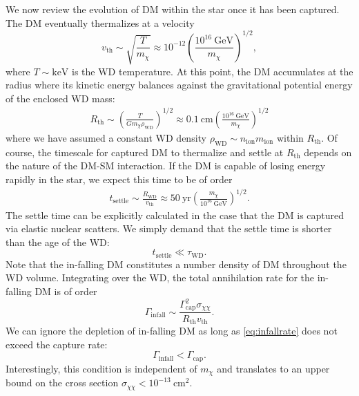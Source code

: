 \documentclass[preprintnumbers,amsmath,amssymb,prd,superscriptaddress]{revtex4}
\newcommand{\GeV}{\text{GeV}}
\newcommand{\keV}{\text{keV}}
\newcommand{\cm}{\text{cm}}
\def\r{\right)}
\def\l{\left(}
\begin{document}
We now review the evolution of DM within the star once it has been captured. 
The DM eventually thermalizes at a velocity
\begin{equation}
v_\text{th} \sim \sqrt{\frac{T}{m_\chi}} \approx 10^{-12} \l \frac{10^{16} ~\GeV}{m_\chi}\r^{1/2},
\end{equation}
where $T \sim \keV$ is the WD temperature.
At this point, the DM accumulates at the radius where its kinetic energy balances against the gravitational potential energy of the enclosed WD mass:
\begin{align}
  R_\text{th} \sim \l \frac{T}{G m_\chi \rho_\text{WD}}\r^{1/2} \approx 0.1 ~\cm \l \frac{10^{16} ~\GeV}{m_\chi}\r^{1/2}
\end{align}
where we have assumed a constant WD density $\rho_\text{WD} \sim n_\text{ion} m_\text{ion}$ within $R_\text{th}$.
Of course, the timescale for captured DM to thermalize and settle at $R_\text{th}$ depends on the nature of the DM-SM interaction.
If the DM is capable of losing energy rapidly in the star, we expect this time to be of order
\begin{align}
\label{eq:tdrift}
  t_\text{settle} \sim \frac{R_\text{WD}}{v_\text{th}}
  \approx 50 ~\text{yr} \l \frac{m_\chi}{10^{16} ~\GeV} \r^{1/2}. 
\end{align}
The settle time can be explicitly calculated in the case that the DM is captured via elastic nuclear scatters. 
We simply demand that the settle time is shorter than the age of the WD:
\begin{equation}
t_\text{settle} \ll \tau_\text{WD}.
\end{equation}
Note that the in-falling DM constitutes a number density of DM throughout the WD volume.
Integrating over the WD, the total annihilation rate for the in-falling DM is of order
\begin{equation}
\label{eq:infallrate}
\Gamma_\text{infall} \sim \frac{\Gamma_\text{cap}^2 \sigma_{\chi \chi}}{R_\text{th} v_\text{th}}.
\end{equation}
We can ignore the depletion of in-falling DM as long as \eqref{eq:infallrate} does not exceed the capture rate:
\begin{equation}
\label{eq:steadycollect}
\Gamma_\text{infall} < \Gamma_\text{cap}.
\end{equation}
Interestingly, this condition is independent of $m_\chi$ and translates to an upper bound on the cross section $\sigma_{\chi \chi} < 10^{-13} ~\text{cm}^2$. 
\end{document}
